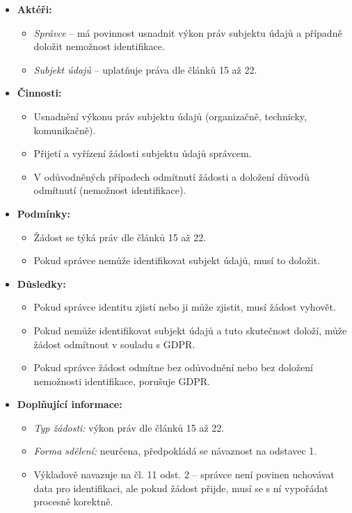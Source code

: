 \begin{itemize}
\item \textbf{Aktéři:}
  \begin{itemize}
    \item \textit{Správce} – má povinnost usnadnit výkon práv subjektu údajů a případně doložit nemožnost identifikace.
    \item \textit{Subjekt údajů} – uplatňuje práva dle článků 15 až 22.
  \end{itemize}

\item \textbf{Činnosti:}
  \begin{itemize}
    \item Usnadnění výkonu práv subjektu údajů (organizačně, technicky, komunikačně).
    \item Přijetí a vyřízení žádosti subjektu údajů správcem.
    \item V odůvodněných případech odmítnutí žádosti a doložení důvodů odmítnutí (nemožnost identifikace).
  \end{itemize}

\item \textbf{Podmínky:}
  \begin{itemize}
    \item Žádost se týká práv dle článků 15 až 22.
    \item Pokud správce nemůže identifikovat subjekt údajů, musí to doložit.
  \end{itemize}

\item \textbf{Důsledky:}
  \begin{itemize}
    \item Pokud správce identitu zjistí nebo ji může zjistit, musí žádost vyhovět.
    \item Pokud nemůže identifikovat subjekt údajů a tuto skutečnost doloží, může žádost odmítnout v souladu s GDPR.
    \item Pokud správce žádost odmítne bez odůvodnění nebo bez doložení nemožnosti identifikace, porušuje GDPR.
  \end{itemize}

\item \textbf{Doplňující informace:}
  \begin{itemize}
    \item \textit{Typ žádosti:} výkon práv dle článků 15 až 22.
    \item \textit{Forma sdělení:} neurčena, předpokládá se návaznost na odstavec 1.
    \item Výkladově navazuje na čl. 11 odst. 2 – správce není povinen uchovávat data pro identifikaci, ale pokud žádost přijde, musí se s ní vypořádat procesně korektně.
  \end{itemize}
\end{itemize}


